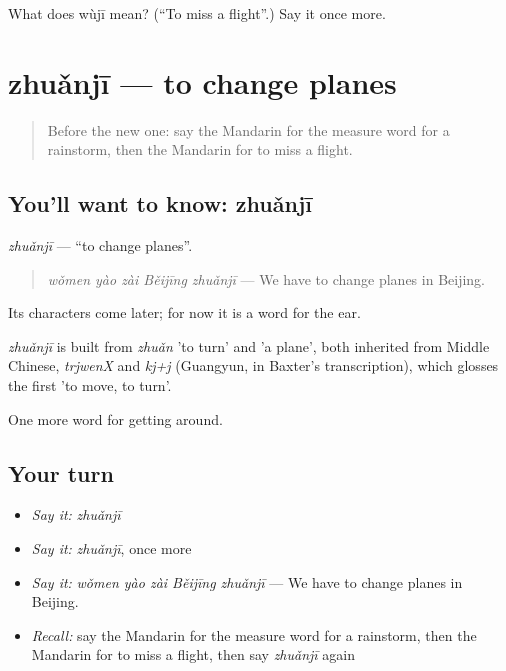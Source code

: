 \begin{tcolorbox}[breakable,colback=teal!4,colframe=teal!35!black,title={Before you move on}]
What does wùjī mean? (\textquotedblleft{}To miss a flight\textquotedblright{}.) Say it once more.
\end{tcolorbox}
\section[zhuǎnjī]{zhuǎnjī — to change planes}

\label{lesson:ZH-C416-zhuanji}



\begin{quote}
Before the new one: say the Mandarin for the measure word for a rainstorm, then the Mandarin for to miss a flight.
\end{quote}

\subsection*{You'll want to know: zhuǎnjī}
\emph{zhuǎnjī} — \textquotedblleft{}to change planes\textquotedblright{}.

\begin{quote}
\emph{wǒmen yào zài Běijīng zhuǎnjī} — We have to change planes in Beijing.
\end{quote}

Its characters come later; for now it is a word for the ear.

\begin{cousinweb}
\emph{zhuǎnjī} is built from \emph{zhuǎn} 'to turn' and  'a plane', both inherited from Middle Chinese, \emph{trjwenX} and \emph{kj+j} (Guangyun, in Baxter's transcription), which glosses the first 'to move, to turn'.
\end{cousinweb}

\begin{grammarlens}[title={What you've built}]
One more word for getting around.
\end{grammarlens}

\subsection*{Your turn}
\begin{itemize}
\raggedright
  \item \emph{Say it:} \emph{zhuǎnjī}
  \item \emph{Say it:} \emph{zhuǎnjī}, once more
  \item \emph{Say it:} \emph{wǒmen yào zài Běijīng zhuǎnjī} — We have to change planes in Beijing.
  \item \emph{Recall:} say the Mandarin for the measure word for a rainstorm, then the Mandarin for to miss a flight, then say \emph{zhuǎnjī} again
\end{itemize}

